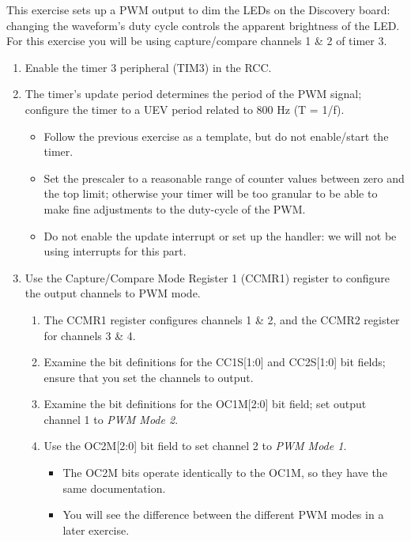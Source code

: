 \documentclass[openany,11pt,fleqn]{book} %
\begin{document}
\begin{exercise}
    \label{ex2}
    This exercise sets up a PWM output to dim the LEDs on the Discovery board: changing the waveform's duty cycle controls the apparent brightness of the LED. For this exercise you will be using capture/compare channels 1 \& 2 of timer 3. 
    
    \begin{enumerate}
        \item Enable the timer 3 peripheral (TIM3) in the RCC.
        \item The timer's update period determines the period of the PWM signal; configure the timer to a UEV period related to 800 Hz (T = 1/f).  
        \begin{itemize}
            \item Follow the previous exercise as a template, but do not enable/start the timer.
            \item Set the prescaler to a reasonable range of counter values between zero and the top limit; otherwise your timer will be too granular to be able to make fine adjustments to the duty-cycle of the PWM.
            \item Do not enable the update interrupt or set up the handler: we will not be using interrupts for this part.
        \end{itemize}
        \item Use the Capture/Compare Mode Register 1 (CCMR1) register to configure the output channels to PWM mode.
        \begin{enumerate}
            \item The CCMR1 register configures channels 1 \& 2, and the CCMR2 register for channels 3 \& 4.
            \item Examine the bit definitions for the CC1S[1:0] and CC2S[1:0] bit fields; ensure that you set the channels to output. 
            \item Examine the bit definitions for the OC1M[2:0] bit field; set output channel 1 to \textit{PWM Mode 2}.
            \item Use the OC2M[2:0] bit field to set channel 2 to \textit{PWM Mode 1}.
            \begin{itemize}
                \item The OC2M bits operate identically to the OC1M, so they have the same documentation. 
                \item You will see the difference between the different PWM modes in a later exercise.

\end{itemize}
\end{enumerate}
\end{enumerate}
\end{exercise}
\end{document}
